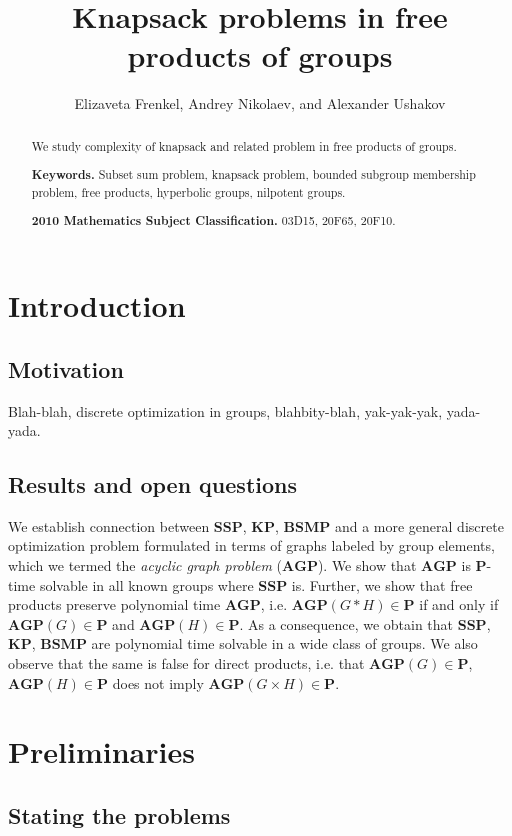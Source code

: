 \documentclass[10pt]{amsart}
\title{Knapsack problems in free products of groups}
\author[]{Elizaveta Frenkel, Andrey Nikolaev, and Alexander Ushakov}
\theoremstyle{definition}
\def\P{{\mathbf{P}}}
\def\SSP{{\mathbf{SSP}}}
\def\BSMP{{\mathbf{BSMP}}}
\def\KP{{\mathbf{KP}}}
\def\AGP{{\mathbf{AGP}}}
\begin{document}
\maketitle

\begin{abstract}
We study complexity of knapsack and related problem in free products of groups.

\noindent
{\bf Keywords.} Subset sum problem,  knapsack problem, bounded subgroup membership problem, free products, hyperbolic groups, nilpotent groups.

\noindent
{\bf 2010 Mathematics Subject Classification.} 03D15, 20F65, 20F10.
\end{abstract}

\tableofcontents

\section{Introduction}\label{sec:intro}


\subsection{Motivation}\label{sub:motivation}
Blah-blah, discrete optimization in groups, blahbity-blah, yak-yak-yak, yada-yada.

\subsection{Results and open questions}\label{sub:results}
We establish connection between $\SSP$, $\KP$, $\BSMP$ and a more general discrete optimization problem formulated in terms of graphs labeled by group elements, which we termed the {\em acyclic graph problem} ($\AGP$). We show that $\AGP$ is $\P$-time solvable in all known groups where $\SSP$ is. Further, we show that free products preserve polynomial time $\AGP$, i.e. $\AGP(G* H)\in\P$ if and only if $\AGP(G)\in\P$ and $\AGP(H)\in\P$. As a consequence, we obtain that $\SSP$, $\KP$, $\BSMP$ are polynomial time solvable in a wide class of groups. We also observe that the same is false for direct products, i.e. that $\AGP(G)\in\P$, $\AGP(H)\in\P$ does not imply $\AGP(G\times H)\in\P$.


\section{Preliminaries}\label{sec:prelim}
\subsection{Stating the problems} \label{sec:problems}
\end{document}
